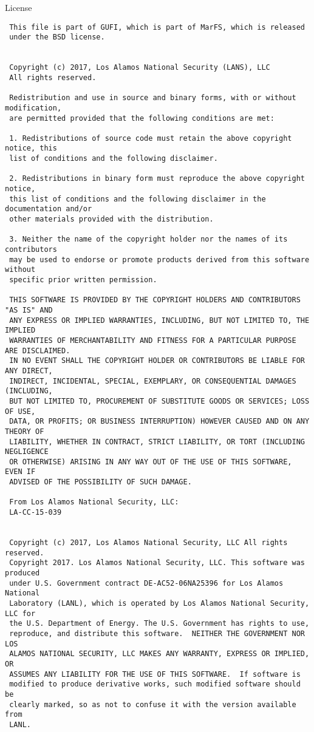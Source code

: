 \begin{Huge}
License
\end{Huge} 
\begin{verbatim}
 This file is part of GUFI, which is part of MarFS, which is released
 under the BSD license.


 Copyright (c) 2017, Los Alamos National Security (LANS), LLC
 All rights reserved.

 Redistribution and use in source and binary forms, with or without modification,
 are permitted provided that the following conditions are met:

 1. Redistributions of source code must retain the above copyright notice, this
 list of conditions and the following disclaimer.

 2. Redistributions in binary form must reproduce the above copyright notice,
 this list of conditions and the following disclaimer in the documentation and/or
 other materials provided with the distribution.

 3. Neither the name of the copyright holder nor the names of its contributors
 may be used to endorse or promote products derived from this software without
 specific prior written permission.

 THIS SOFTWARE IS PROVIDED BY THE COPYRIGHT HOLDERS AND CONTRIBUTORS "AS IS" AND
 ANY EXPRESS OR IMPLIED WARRANTIES, INCLUDING, BUT NOT LIMITED TO, THE IMPLIED
 WARRANTIES OF MERCHANTABILITY AND FITNESS FOR A PARTICULAR PURPOSE ARE DISCLAIMED.
 IN NO EVENT SHALL THE COPYRIGHT HOLDER OR CONTRIBUTORS BE LIABLE FOR ANY DIRECT,
 INDIRECT, INCIDENTAL, SPECIAL, EXEMPLARY, OR CONSEQUENTIAL DAMAGES (INCLUDING,
 BUT NOT LIMITED TO, PROCUREMENT OF SUBSTITUTE GOODS OR SERVICES; LOSS OF USE,
 DATA, OR PROFITS; OR BUSINESS INTERRUPTION) HOWEVER CAUSED AND ON ANY THEORY OF
 LIABILITY, WHETHER IN CONTRACT, STRICT LIABILITY, OR TORT (INCLUDING NEGLIGENCE
 OR OTHERWISE) ARISING IN ANY WAY OUT OF THE USE OF THIS SOFTWARE, EVEN IF
 ADVISED OF THE POSSIBILITY OF SUCH DAMAGE.

 From Los Alamos National Security, LLC:
 LA-CC-15-039


 Copyright (c) 2017, Los Alamos National Security, LLC All rights reserved.
 Copyright 2017. Los Alamos National Security, LLC. This software was produced
 under U.S. Government contract DE-AC52-06NA25396 for Los Alamos National
 Laboratory (LANL), which is operated by Los Alamos National Security, LLC for
 the U.S. Department of Energy. The U.S. Government has rights to use,
 reproduce, and distribute this software.  NEITHER THE GOVERNMENT NOR LOS
 ALAMOS NATIONAL SECURITY, LLC MAKES ANY WARRANTY, EXPRESS OR IMPLIED, OR
 ASSUMES ANY LIABILITY FOR THE USE OF THIS SOFTWARE.  If software is
 modified to produce derivative works, such modified software should be
 clearly marked, so as not to confuse it with the version available from
 LANL.



\end{verbatim}
